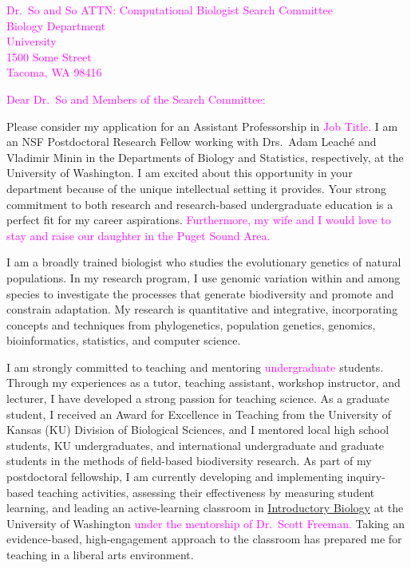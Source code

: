 \documentclass[letterpaper, 10pt]{letter}
\newcommand{\highlight}[1]{\textcolor{magenta}{#1}}
\begin{document}
\begin{letter}{
        \highlight{
        Dr.\ So  and So
        ATTN: Computational Biologist Search Committee \\
        Biology Department \\
        University \\
        1500 Some Street \\
        Tacoma, WA 98416
        }
    }
\opening{
    \highlight{
    Dear Dr.\ So and Members of the Search Committee:
    }
}
Please consider my application for an Assistant Professorship in
\highlight{
Job Title.
}
I am an NSF Postdoctoral Research Fellow working with Drs.\ Adam Leach\'{e} and
Vladimir Minin in the Departments of Biology and Statistics, respectively, at
the University of Washington.
I am excited about this opportunity in your department because of the unique
intellectual setting it provides.
Your strong commitment to both research and research-based undergraduate
education is a perfect fit for my career aspirations.
\highlight{
Furthermore, my wife and I would love to stay and raise our daughter in the
Puget Sound Area.
}

I am a broadly trained biologist who studies the evolutionary genetics of
natural populations.
In my research program, I use genomic variation within and among species to
investigate the processes that generate biodiversity and promote and constrain
adaptation.
My research is quantitative and integrative, incorporating concepts and
techniques from phylogenetics, population genetics, genomics, bioinformatics,
statistics, and computer science.

I am strongly committed to teaching and mentoring
\highlight{
    undergraduate
}
students.
Through my experiences as a tutor, teaching assistant, workshop instructor,
and lecturer, I have developed a strong passion for teaching science.
As a graduate student, I received an Award for Excellence in Teaching from the
University of Kansas (KU) Division of Biological Sciences, and I mentored local
high school students, KU undergraduates, and international undergraduate and
graduate students in the methods of field-based biodiversity research.
As part of my postdoctoral fellowship, I am currently developing and
implementing inquiry-based teaching activities, assessing their effectiveness
by measuring student learning, and leading an active-learning classroom in
\href{http://courses.biology.washington.edu/biol180/}{Introductory Biology} at
the University of Washington
\highlight{
    under the mentorship of Dr.\ Scott Freeman.
}
Taking an evidence-based, high-engagement approach to the classroom has
prepared me for teaching in a liberal arts environment.



\end{letter}
\end{document}
